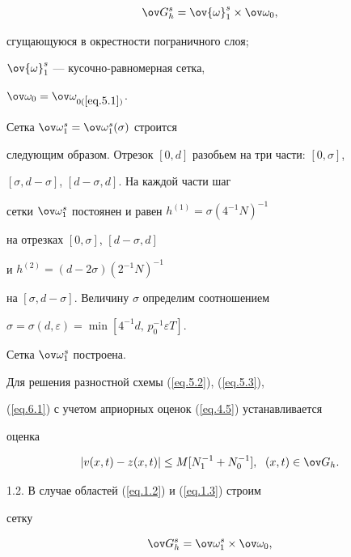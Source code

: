 \begin{equation}


\label{eq.6.1}


\ov G^s_h=\ov{\omega}^s_1\times \ov\omega_0,


\end{equation}


сгущающуюся в окрестности пограничного слоя;


$\ov{\omega}^s_1$ --- кусочно-равномерная сетка,


$\ov\omega_0=\ov\omega_{0(\ref{eq.5.1})}$.


Сетка $\ov\omega^s_1=\ov\omega^s_1(\sigma)$ строится


следующим образом. Отрезок $[0, d]$ разобьем на три части: $[0, \sigma]$,


$[\sigma, d-\sigma]$, $[d-\sigma, d]$. На каждой части шаг


сетки $\ov\omega^s_1$ постоянен и равен $h^{(1)}=\sigma{(4^{-1} N)}^{-1}$


на отрезках $[0, \sigma]$, $[d-\sigma,d]$


и $h^{(2)}=(d-2\sigma){(2^{-1} N)}^{-1}$


на $[\sigma, d-\sigma]$. Величину $\sigma$ определим соотношением


$\sigma=\sigma(d, \varepsilon)=\min [4^{-1} d, \, p_0^{-1} \varepsilon T]$.


Сетка $\ov\omega^s_1$ построена.





Для решения разностной схемы (\ref{eq.5.2}), (\ref{eq.5.3}),


(\ref{eq.6.1}) с учетом априорных оценок (\ref{eq.4.5}) устанавливается


оценка


\begin{equation}


\label{eq.6.2}


|v(x, t)-z(x, t)|\le M [N_1^{-1}+N_0^{-1}], \ \; (x, t)\in \ov G_h.


\end{equation}





1.2. В случае областей (\ref{eq.1.2}) и (\ref{eq.1.3}) строим


сетку


\begin{equation}


\label{eq.6.3}


\ov G^s_h=\ov\omega^s_1\times \ov\omega_0,


\end{equation}


